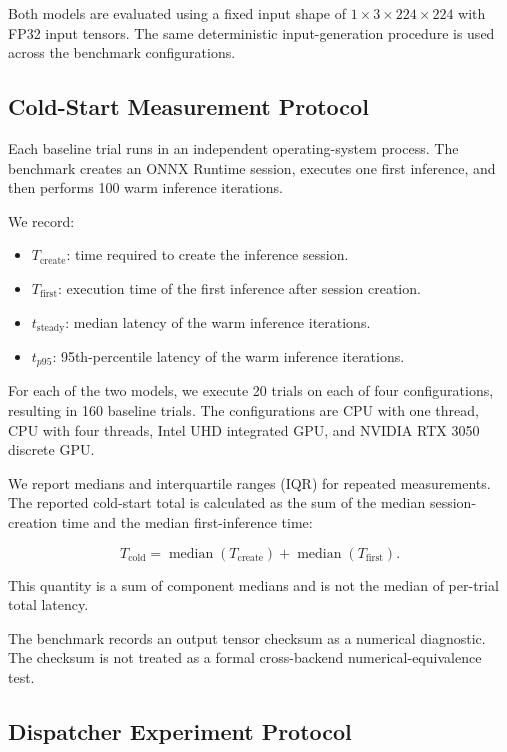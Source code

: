 \documentclass[pdflatex,sn-mathphys-num]{sn-jnl}
\begin{document}
Both models are evaluated using a fixed input shape of $1 \times 3 \times 224 \times 224$ with FP32 input tensors. The same deterministic input-generation procedure is used across the benchmark configurations.

\subsection{Cold-Start Measurement Protocol}

Each baseline trial runs in an independent operating-system process. The benchmark creates an ONNX Runtime session, executes one first inference, and then performs 100 warm inference iterations.

We record:

\begin{itemize}
    \item $T_{\mathrm{create}}$: time required to create the inference session.
    \item $T_{\mathrm{first}}$: execution time of the first inference after session creation.
    \item $t_{\mathrm{steady}}$: median latency of the warm inference iterations.
    \item $t_{p95}$: 95th-percentile latency of the warm inference iterations.
\end{itemize}

For each of the two models, we execute 20 trials on each of four configurations, resulting in 160 baseline trials. The configurations are CPU with one thread, CPU with four threads, Intel UHD integrated GPU, and NVIDIA RTX 3050 discrete GPU.

We report medians and interquartile ranges (IQR) for repeated measurements. The reported cold-start total is calculated as the sum of the median session-creation time and the median first-inference time:

\begin{equation}
T_{\mathrm{cold}} =
\operatorname{median}(T_{\mathrm{create}})
+
\operatorname{median}(T_{\mathrm{first}}).
\end{equation}

This quantity is a sum of component medians and is not the median of per-trial total latency.

The benchmark records an output tensor checksum as a numerical diagnostic. The checksum is not treated as a formal cross-backend numerical-equivalence test.

\subsection{Dispatcher Experiment Protocol}
\end{document}
